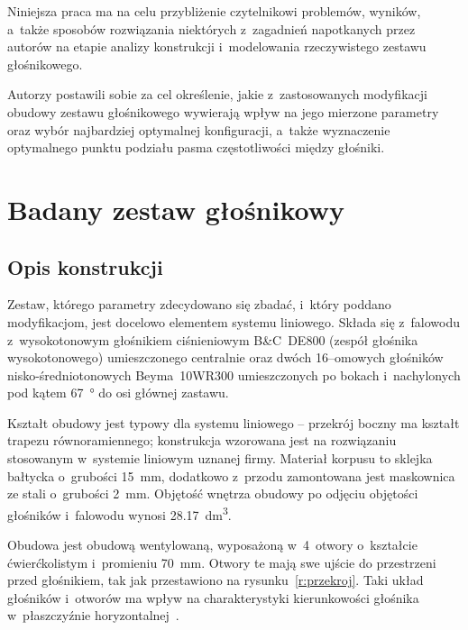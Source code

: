 \documentclass[12pt]{oska}
\newcommand{\comment}[1]{{\color{magenta}\emph{\textbf{#1}}}}
\begin{document}
	Niniejsza praca ma na celu przybliżenie czytelnikowi problemów, wyników, a~także sposobów rozwiązania niektórych z~zagadnień napotkanych przez autorów na etapie analizy konstrukcji i~modelowania rzeczywistego zestawu głośnikowego.
	
	Autorzy postawili sobie za cel określenie, jakie z~zastosowanych modyfikacji obudowy zestawu głośnikowego wywierają wpływ na jego mierzone parametry oraz wybór najbardziej optymalnej konfiguracji, a~także wyznaczenie optymalnego punktu podziału pasma częstotliwości między głośniki.
	
	
	
	\section{Badany zestaw głośnikowy}
	
	\subsection{Opis konstrukcji}\label{ss:opis}
	
	Zestaw, którego parametry zdecydowano się zbadać, i~który poddano modyfikacjom, jest docelowo elementem systemu liniowego. Składa się z~falowodu z~wysokotonowym głośnikiem ciśnieniowym B\&C~DE800 (zespół głośnika wysokotonowego) umieszczonego centralnie oraz dwóch 16--omowych głośników nisko-średniotonowych Beyma~10WR300 umieszczonych po bokach i~nachylonych pod kątem \SI{67}{\degree} do osi głównej zastawu.
	
	Kształt obudowy jest typowy dla systemu liniowego -- przekrój boczny ma kształt trapezu równoramiennego; konstrukcja wzorowana jest na rozwiązaniu stosowanym w~systemie liniowym uznanej firmy. Materiał korpusu to sklejka bałtycka o~grubości \SI{15}{\milli\metre}, dodatkowo z~przodu zamontowana jest maskownica ze stali o~grubości \SI{2}{\milli\metre}. Objętość wnętrza obudowy po odjęciu objętości głośników i~falowodu wynosi \SI{28,17}{\deci\metre\cubed}.
	
	Obudowa jest obudową wentylowaną, wyposażoną w~4~otwory o~kształcie ćwierćkolistym i~promieniu \SI{70}{\milli\metre}. Otwory te mają swe ujście do przestrzeni przed głośnikiem, tak jak przestawiono na rysunku~\ref{r:przekroj}. %
	Taki układ głośników i~otworów ma wpływ na charakterystyki kierunkowości głośnika w~płaszczyźnie horyzontalnej~\cite{kmiecik_inz}. %
	
\end{document}
